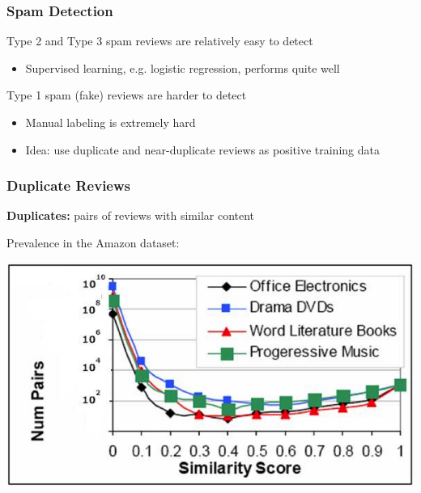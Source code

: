 \documentclass[t]{beamer}
\begin{document}
\begin{frame} \frametitle{Spam Detection} %

Type 2 and Type 3 spam reviews are relatively easy to detect
\begin{itemize} 
\item Supervised learning, e.g. logistic regression, performs quite well
\end{itemize}

Type 1 spam (fake) reviews are harder to detect
\begin{itemize}
\item Manual labeling is extremely hard 
\item Idea: use duplicate and near-duplicate reviews as positive training data
\end{itemize}

\end{frame}



\begin{frame} \frametitle{Duplicate Reviews} %
\textbf{Duplicates:} pairs of reviews with similar content

\vfill
Prevalence in the Amazon dataset:
\begin{center}
     \includegraphics[width=\textwidth]{amazon-reviews-duplicates}
\end{center}

\end{frame}
\end{document}
